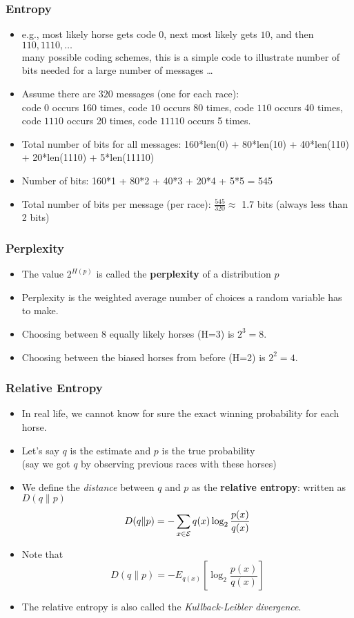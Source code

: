 \begin{frame}
\frametitle{Entropy}
\begin{itemize}[<+->]
\item e.g., most likely horse gets code $0$, next most likely gets $10$, and then $110, 1110, \ldots$ \\ {\small many possible coding schemes, this is a simple code to illustrate number of bits needed for a large number of messages \ldots}
\item Assume there are $320$ messages (one for each race): \\
code $0$ occurs 160 times, code $10$ occurs 80 times, code $110$ occurs 40 times, code $1110$ occurs 20 times, code $11110$ occurs 5 times.
\item Total number of bits for all messages: 160*len(0) + 80*len(10) + 40*len(110) + 20*len(1110) + 5*len(11110) 
\item Number of bits: 160*1 + 80*2 + 40*3 + 20*4 + 5*5 = 545
\item Total number of bits per message (per race): $\frac{545}{320} \approx$ 1.7 bits (always less than 2 bits)
\end{itemize}

\end{frame}

\begin{frame}
\frametitle{Perplexity}
\begin{itemize}[<+->]
\item The value $2^{H(p)}$ is called the {\bf perplexity} of a distribution $p$
\item Perplexity is the weighted average number of choices a random
  variable has to make.
\item Choosing between 8 equally likely horses (H=3) is $2^3 = 8$.
\item Choosing between the biased horses from before (H=2) is $2^2 =
  4$. 
\end{itemize}

\end{frame}

\begin{frame}
\frametitle{Relative Entropy}
\begin{itemize}[<+->]
\item In real life, we cannot know for sure the exact winning
  probability for each horse. 
\item Let's say $q$ is the estimate
  and $p$ is the true probability \\
  {\small (say we got $q$ by observing previous races with these horses)}
\item We define the {\em distance} between $q$ and $p$ as the {\bf relative entropy}: written as $D(q \| p)$
\[ D(q \| p) = - \sum_{x \in {\cal E}} q(x) \log_2 \frac{p(x)}{q(x)} \]
\item Note that
\[ D(q \| p) = - E_{ q(x) } \left[ \log_2 \frac{p(x)}{q(x)} \right] \]
\item The relative entropy is also called the {\em Kullback-Leibler divergence}.
\end{itemize}

\end{frame}

